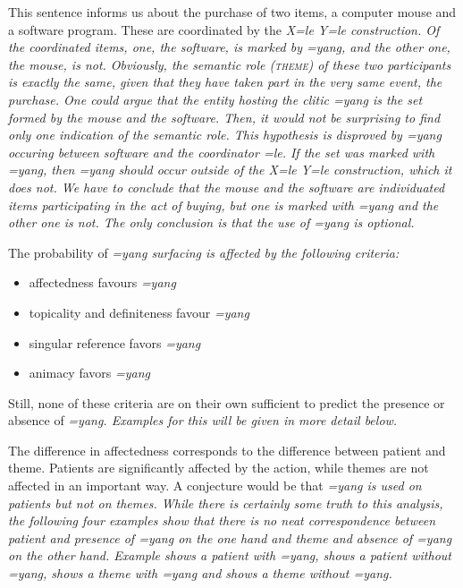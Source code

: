 This sentence informs us about the purchase of two items, a computer mouse and a software program. These are coordinated by the \em X=le Y=le \em construction. Of the coordinated items, one, the software, is marked by \em =yang\em, and the other one, the mouse, is not. Obviously, the semantic role (\textsc{theme}) of these two participants is exactly the same, given that they have taken part in the very same event, the purchase. One could argue that the entity hosting the clitic \em =yang \em is the set formed by the mouse and the software. Then, it would not be surprising to find only one indication of the semantic role. This hypothesis is disproved by \em =yang \em occuring between \em software \em and the coordinator \em =le\em. If the set was marked with \em =yang\em, then \em =yang \em should occur \em outside \em of the \em X=le Y=le \em construction, which it does not. We have to conclude that the mouse and the software are individuated items participating in the act of buying, but one is marked with \em =yang \em and the other one is not. The only conclusion is that the use of \em =yang \em is optional.

The probability of \em =yang \em surfacing is affected by the following criteria:

\begin{itemize}
	\item affectedness favours \em =yang \em
	\item topicality and definiteness favour \em =yang \em
	\item singular reference favors \em =yang \em
	\item animacy  favors \em =yang \em
\end{itemize}



Still, none of these criteria are on their own sufficient to predict the presence or absence of \em =yang\em. Examples for this will be given in more detail below.

The difference in affectedness corresponds to the difference between patient and theme. Patients are significantly affected by the action, while themes are not affected in an important way. A conjecture would be that \em =yang \em is used on patients but not on themes. While there is certainly some truth to this analysis, the following four examples show that there is no neat correspondence between patient and presence of \em =yang \em on the one hand and theme and absence of \em =yang \em on the other hand. Example  shows a patient with \em =yang\em,  shows a patient without \em =yang\em,  shows a theme with \em =yang \em and  shows a theme without \em =yang\em.


